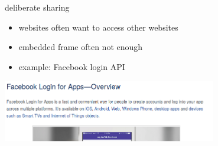 \begin{frame}{deliberate sharing}
    \begin{itemize}
    \item websites often want to access other websites
    \item embedded frame often not enough
        \vspace{.5cm}
    \item example: Facebook login API
    \end{itemize}
    \includegraphics[width=0.7\textwidth]{fb-login-api}
\end{frame}

